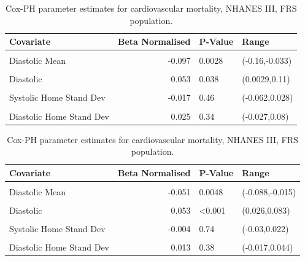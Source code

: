 \documentclass[
]{article}
\begin{document}
\begin{table}[!h]
\centering
\caption{\label{tab:freqCVDNF}Cox-PH parameter estimates for cardiovascular mortality, NHANES III, FRS population.}
\centering
\begin{tabular}[t]{lrll}
\toprule
Covariate & Beta Normalised & P-Value & Range\\
\midrule
\cellcolor{gray!10}{Systolic Mean} & \cellcolor{gray!10}{0.312} & \cellcolor{gray!10}{<0.001} & \cellcolor{gray!10}{(0.25,0.37)}\\
Diastolic Mean & -0.097 & 0.0028 & (-0.16,-0.033)\\
\cellcolor{gray!10}{Systolic} & \cellcolor{gray!10}{0.065} & \cellcolor{gray!10}{0.0025} & \cellcolor{gray!10}{(0.023,0.11)}\\
Diastolic & 0.053 & 0.038 & (0.0029,0.11)\\
\cellcolor{gray!10}{Systolic Clinic Stand Dev} & \cellcolor{gray!10}{-0.008} & \cellcolor{gray!10}{0.72} & \cellcolor{gray!10}{(-0.054,0.036)}\\
Systolic Home Stand Dev & -0.017 & 0.46 & (-0.062,0.028)\\
\cellcolor{gray!10}{Diastolic Clinic Stand Dev} & \cellcolor{gray!10}{-0.027} & \cellcolor{gray!10}{0.3} & \cellcolor{gray!10}{(-0.08,0.025)}\\
Diastolic Home Stand Dev & 0.025 & 0.34 & (-0.027,0.08)\\
\bottomrule
\end{tabular}
\end{table}

\begin{table}[!h]
\centering
\caption{\label{tab:freqALLNF}Cox-PH parameter estimates for cardiovascular mortality, NHANES III, FRS population.}
\centering
\begin{tabular}[t]{lrll}
\toprule
Covariate & Beta Normalised & P-Value & Range\\
\midrule
\cellcolor{gray!10}{Systolic Mean} & \cellcolor{gray!10}{0.166} & \cellcolor{gray!10}{<0.001} & \cellcolor{gray!10}{(0.13,0.19)}\\
Diastolic Mean & -0.051 & 0.0048 & (-0.088,-0.015)\\
\cellcolor{gray!10}{Systolic} & \cellcolor{gray!10}{0.047} & \cellcolor{gray!10}{<0.001} & \cellcolor{gray!10}{(0.022,0.07)}\\
Diastolic & 0.053 & <0.001 & (0.026,0.083)\\
\cellcolor{gray!10}{Systolic Clinic Stand Dev} & \cellcolor{gray!10}{-0.009} & \cellcolor{gray!10}{0.49} & \cellcolor{gray!10}{(-0.036,0.017)}\\
Systolic Home Stand Dev & -0.004 & 0.74 & (-0.03,0.022)\\
\cellcolor{gray!10}{Diastolic Clinic Stand Dev} & \cellcolor{gray!10}{-0.005} & \cellcolor{gray!10}{0.72} & \cellcolor{gray!10}{(-0.033,0.023)}\\
Diastolic Home Stand Dev & 0.013 & 0.38 & (-0.017,0.044)\\
\bottomrule
\end{tabular}
\end{table}
\end{document}

